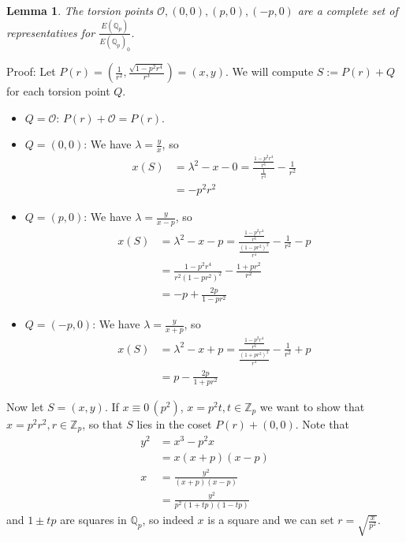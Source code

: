 \documentclass[11pt,a4paper]{amsart}
\theoremstyle{plain}
\newtheorem{lemma}[prop]{Lemma}
\theoremstyle{definition}
\theoremstyle{remark}
\numberwithin{equation}{section}
\newcommand{\ZZ}{{\mathbb Z}}
\newcommand{\QQ}{{\mathbb Q}}
\newcommand{\OO}{{\mathcal O}}
\newcommand{\EQp}{{E(\QQ_p)}}
\newcommand{\1}{{\mathds 1}}
\begin{document}
\begin{lemma}
  The torsion points $\OO, (0,0), (p,0), (-p,0)$ are a complete set of
  representatives for $\frac{\EQp}{\EQp_0}$.
\end{lemma}
Proof: Let $P(r) = (\frac{1}{r^2}, \frac{\sqrt{1-p^2r^4}}{r^3}) = (x,y)$. We will
compute $S := P(r) + Q$ for each torsion point $Q$.
\begin{itemize}
  \item $Q = \OO$: $P(r) + \OO = P(r)$.
  \item $Q = (0,0)$:
    We have $\lambda = \frac{y}{x}$, so
    \begin{equation*}
      \begin{split}
        x(S)
        &= \lambda^2 - x - 0 =
        \frac{\frac{1 - p^2r^4}{r^6}}{\frac{1}{r^4}} - \frac{1}{r^2} \\
        &= -p^2r^2
      \end{split}
    \end{equation*}
  \item $Q = (p, 0)$: We have $\lambda = \frac{y}{x-p}$, so
    \begin{equation*}
      \begin{split}
        x(S)
        &= \lambda^2 - x - p = 
        \frac{\frac{1 - p^2r^4}{r^6}}{\frac{(1-pr^2)^2}{r^4}} -
        \frac{1}{r^2} - p \\
        &= \frac{1-p^2r^4}{r^2(1-pr^2)^2} - \frac{1+pr^2}{r^2} \\
        &= -p + \frac{2p}{1-pr^2}
      \end{split}
    \end{equation*}
  \item $Q = (-p, 0)$: We have $\lambda = \frac{y}{x+p}$, so
    \begin{equation*}
      \begin{split}
        x(S)
        &= \lambda^2 - x + p = 
        \frac{\frac{1 - p^2r^4}{r^6}}{\frac{(1+pr^2)^2}{r^4}} -
        \frac{1}{r^2} + p \\
        &= p - \frac{2p}{1+pr^2}
      \end{split}
    \end{equation*}
\end{itemize}

Now let $S = (x,y)$.
If $x \equiv 0 \, (p^2)$, $x = p^2 t, t \in \ZZ_p$ we want to show that $x = p^2r^2, r \in \ZZ_p$, so that $S$ lies
in the coset $P(r) + (0,0)$. Note that
\begin{equation*}
  \begin{split}
    y^2 &= x^3 - p^2x \\
    &= x(x+p)(x-p) \\
    x &= \frac{y^2}{(x+p)(x-p)} \\
    &= \frac{y^2}{p^2(1+tp)(1-tp)}
  \end{split}
\end{equation*}
and $1 \pm tp$ are squares in $\QQ_p$, so indeed $x$ is a square and we can set
$r = \sqrt{\frac{x}{p^2}}$.
\end{document}
